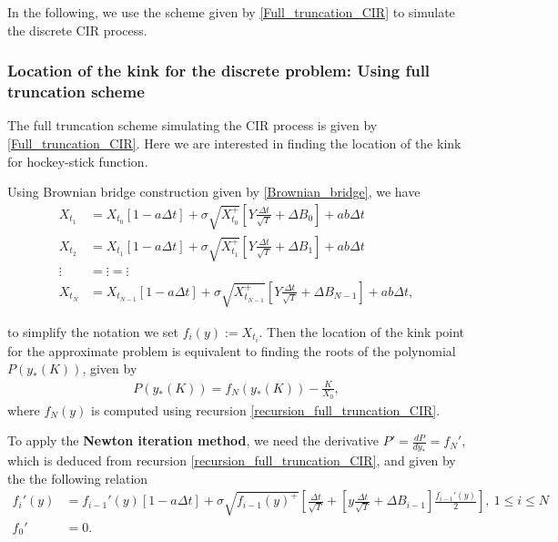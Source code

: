 \documentclass[11pt]{article}
\begin{document}
In the following, we use the scheme given by \eqref{Full_truncation_CIR} to simulate the discrete CIR process.
\subsubsection{Location of the kink for the discrete problem: Using full truncation scheme}\label{sec:kink_location_full_truncation)_CIR}


The full truncation scheme simulating the CIR process is given by \eqref{Full_truncation_CIR}. Here we are interested in finding the location of the kink for hockey-stick function.


Using Brownian bridge construction given by \eqref{Brownian_bridge}, we have
\begin{align}\label{recursion_full_truncation_CIR}
X_{t_1}&= X_{t_0} \left[ 1- a \Delta t  \right]+ \sigma \sqrt{X_{t_0}^+} \left[   Y \frac{\Delta t}{\sqrt{T}} + \Delta B_0\right]+ ab \Delta t\nonumber\\
X_{t_2}&= X_{t_1} \left[ 1- a \Delta t  \right]+ \sigma \sqrt{X_{t_1}^+} \left[   Y \frac{\Delta t}{\sqrt{T}} + \Delta B_1\right]+ ab \Delta t \nonumber\\ 
\vdots &= \vdots =\vdots \nonumber\\
X_{t_N}&= X_{t_{N-1}} \left[ 1- a \Delta t  \right]+ \sigma \sqrt{X_{t_{N-1}}^+} \left[   Y \frac{\Delta t}{\sqrt{T}} + \Delta B_{N-1} \right]+ ab \Delta t ,
\end{align}


to simplify the notation we set $f_i(y):=X_{t_i}$. Then  the location of the kink point for the approximate problem is equivalent to finding the roots of the polynomial $P(y_\ast(K))$, given by
\begin{align}\label{polynomial_kink_location_CIR_full_truncation}
P(y_{\ast}(K))=f_N(y_\ast(K))-\frac{K}{X_0},
\end{align}
where $f_N(y)$ is computed using recursion \eqref{recursion_full_truncation_CIR}.

To apply the \textbf{Newton iteration method}, we need the derivative $P'=\frac{d P}{d y_\ast}=f_N'$, which is deduced from recursion \eqref{recursion_full_truncation_CIR}, and given by the the following relation
\begin{align}
f_i'(y) &= f_{i-1}'(y)\left[1-a \Delta t \right]+ \sigma \sqrt{f_{i-1}(y)^+} \left[ \frac{\Delta t}{\sqrt{T}}+ \left[y \frac{\Delta t}{\sqrt{T}}+\Delta B_{i-1}\right] \frac{f_{i-1}'(y)}{2} \right],\: 1 \le i \le N \nonumber\\
f_0'&=0.
\end{align}
\end{document}
